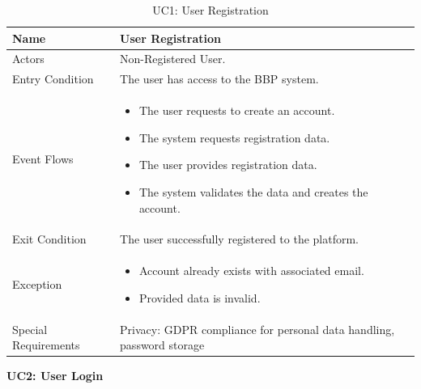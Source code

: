 \begin{table}[H]
    \centering
    \renewcommand{\arraystretch}{1.3}
    \begin{tabular}{|p{}|p{}|}
        \hline
        Name & \textbf{User Registration} \\
        \hline
        Actors & Non-Registered User. \\
        \hline
        Entry Condition & The user has access to the BBP system. \\
        \hline
        Event Flows & \begin{itemize}[topsep=0pt, partopsep=0pt, leftmargin=*]
            \item The user requests to create an account.
            \item The system requests registration data.
            \item The user provides registration data.
            \item The system validates the data and creates the account.
         \end{itemize} \\
        \hline
        Exit Condition & The user successfully registered to the platform. \\
        \hline
        Exception & \begin{itemize}[topsep=0pt, partopsep=0pt, leftmargin=*]
            \item Account already exists with associated email.
            \item Provided data is invalid.
        \end{itemize} \\
        \hline
        Special Requirements & Privacy: GDPR compliance for personal data handling, password storage \\
        \hline
    \end{tabular}
    \caption{UC1: User Registration}
    \label{tab:uc1}
\end{table}

\vspace{12pt}
\noindent
\textbf{UC2: User Login}

